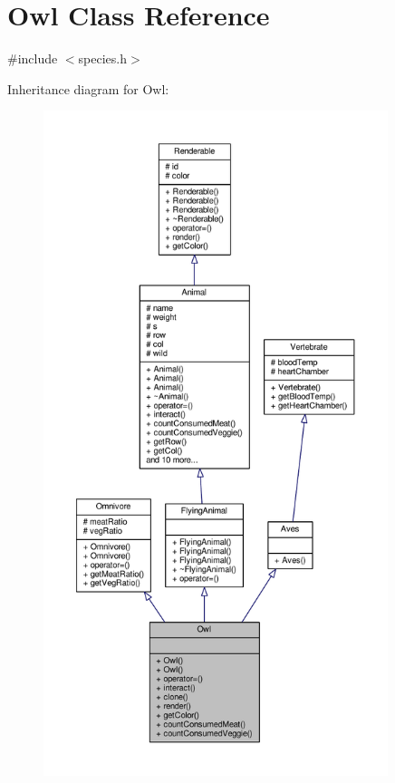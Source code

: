 \hypertarget{classOwl}{}\section{Owl Class Reference}
\label{classOwl}


{\ttfamily \#include $<$species.\+h$>$}



Inheritance diagram for Owl\+:
\nopagebreak
\begin{figure}[H]
\begin{center}
\leavevmode
\includegraphics[height=550pt]{classOwl__inherit__graph}
\end{center}
\end{figure}


